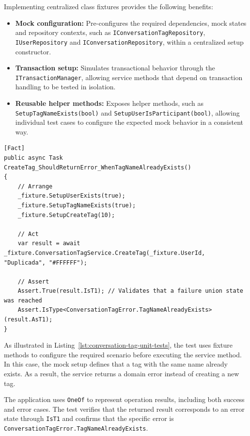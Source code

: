 Implementing centralized class fixtures provides the following benefits:

\begin{itemize}
\item \textbf{Mock configuration:} Pre-configures the required dependencies, mock states and repository contexts, such as \texttt{IConversationTagRepository}, \texttt{IUserRepository} and \texttt{IConversationRepository}, within a centralized setup constructor.
\item \textbf{Transaction setup:} Simulates transactional behavior through the \texttt{ITransactionManager}, allowing service methods that depend on transaction handling to be tested in isolation.
\item \textbf{Reusable helper methods:} Exposes helper methods, such as \texttt{SetupTagNameExists(bool)} and \texttt{SetupUserIsParticipant(bool)}, allowing individual test cases to configure the expected mock behavior in a consistent way.
\end{itemize}


\begin{lstlisting}[caption={Unit test execution inside ConversationTagServiceTests}, label={lst:conversation-tag-unit-tests}]
[Fact]
public async Task CreateTag_ShouldReturnError_WhenTagNameAlreadyExists()
{
    // Arrange
    _fixture.SetupUserExists(true);
    _fixture.SetupTagNameExists(true);
    _fixture.SetupCreateTag(10);

    // Act
    var result = await _fixture.ConversationTagService.CreateTag(_fixture.UserId, "Duplicada", "#FFFFFF");

    // Assert
    Assert.True(result.IsT1); // Validates that a failure union state was reached
    Assert.IsType<ConversationTagError.TagNameAlreadyExists>(result.AsT1);
}
\end{lstlisting}

As illustrated in Listing~\ref{lst:conversation-tag-unit-tests}, the test uses fixture methods to configure the required scenario before executing the service method. In this case, the mock setup defines that a tag with the same name already exists. As a result, the service returns a domain error instead of creating a new tag.

The application uses \texttt{OneOf} to represent operation results, including both success and error cases. The test verifies that the returned result corresponds to an error state through \texttt{IsT1} and confirms that the specific error is \texttt{ConversationTagError.TagNameAlreadyExists}.